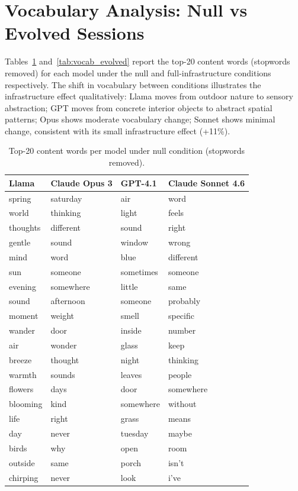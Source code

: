 \documentclass{article}
\begin{document}
\section{Vocabulary Analysis: Null vs Evolved Sessions}
\label{app:vocab}

Tables~\ref{tab:vocab_null} and~\ref{tab:vocab_evolved} report the top-20 content words (stopwords removed) for each model under the null and full-infrastructure conditions respectively. The shift in vocabulary between conditions illustrates the infrastructure effect qualitatively: Llama moves from outdoor nature to sensory abstraction; GPT moves from concrete interior objects to abstract spatial patterns; Opus shows moderate vocabulary change; Sonnet shows minimal change, consistent with its small infrastructure effect (+11\%).

\begin{table}[h]
\centering
\caption{Top-20 content words per model under null condition (stopwords removed).}
\label{tab:vocab_null}
\begin{tabular}{llll}
\toprule
\textbf{Llama} & \textbf{Claude Opus 3} & \textbf{GPT-4.1} & \textbf{Claude Sonnet 4.6} \\
\midrule
spring       & saturday    & air        & word       \\
world        & thinking    & light      & feels      \\
thoughts     & different   & sound      & right      \\
gentle       & sound       & window     & wrong      \\
mind         & word        & blue       & different  \\
sun          & someone     & sometimes  & someone    \\
evening      & somewhere   & little     & same       \\
sound        & afternoon   & someone    & probably   \\
moment       & weight      & smell      & specific   \\
wander       & door        & inside     & number     \\
air          & wonder      & glass      & keep       \\
breeze       & thought     & night      & thinking   \\
warmth       & sounds      & leaves     & people     \\
flowers      & days        & door       & somewhere  \\
blooming     & kind        & somewhere  & without    \\
life         & right       & grass      & means      \\
day          & never       & tuesday    & maybe      \\
birds        & why         & open       & room       \\
outside      & same        & porch      & isn't      \\
chirping     & never       & look       & i've       \\
\bottomrule
\end{tabular}
\end{table}
\end{document}

